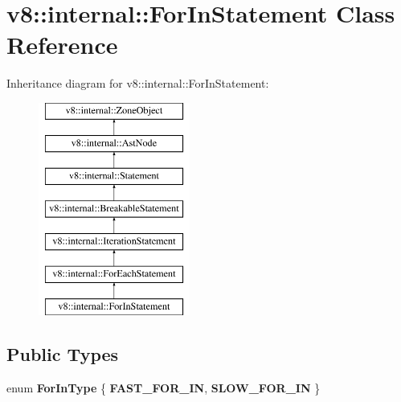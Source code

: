 \hypertarget{classv8_1_1internal_1_1ForInStatement}{}\section{v8\+:\+:internal\+:\+:For\+In\+Statement Class Reference}
\label{classv8_1_1internal_1_1ForInStatement}
Inheritance diagram for v8\+:\+:internal\+:\+:For\+In\+Statement\+:\begin{figure}[H]
\begin{center}
\leavevmode
\includegraphics[height=7.000000cm]{classv8_1_1internal_1_1ForInStatement}
\end{center}
\end{figure}
\subsection*{Public Types}
\begin{DoxyCompactItemize}
\item 
\mbox{\label{classv8_1_1internal_1_1ForInStatement_a07ec4df87c6954017f3aa27f6aa328d2}} 
enum {\bfseries For\+In\+Type} \{ {\bfseries F\+A\+S\+T\+\_\+\+F\+O\+R\+\_\+\+IN}, 
{\bfseries S\+L\+O\+W\+\_\+\+F\+O\+R\+\_\+\+IN}
 \}
\end{DoxyCompactItemize}
